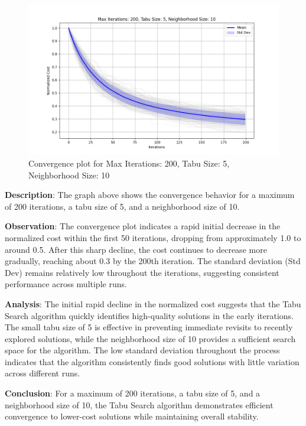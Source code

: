 \documentclass{article}
\begin{document}
    \begin{figure}[H]
        \centering
        \includegraphics[width=\textwidth]{tabu_search/max_iter_200_tabu_size_5_neighborhood_size_10}
        \caption{Convergence plot for Max Iterations: 200, Tabu Size: 5, Neighborhood Size: 10}
        \label{fig:ts_200_5_10}
    \end{figure}

    \textbf{Description}: The graph above shows the convergence behavior for a maximum of 200 iterations, a tabu size of 5, and a neighborhood size of 10.

    \textbf{Observation}: The convergence plot indicates a rapid initial decrease in the normalized cost within the first 50 iterations, dropping from approximately 1.0 to around 0.5. After this sharp decline, the cost continues to decrease more gradually, reaching about 0.3 by the 200th iteration. The standard deviation (Std Dev) remains relatively low throughout the iterations, suggesting consistent performance across multiple runs.

    \textbf{Analysis}: The initial rapid decline in the normalized cost suggests that the Tabu Search algorithm quickly identifies high-quality solutions in the early iterations. The small tabu size of 5 is effective in preventing immediate revisits to recently explored solutions, while the neighborhood size of 10 provides a sufficient search space for the algorithm. The low standard deviation throughout the process indicates that the algorithm consistently finds good solutions with little variation across different runs.

    \textbf{Conclusion}: For a maximum of 200 iterations, a tabu size of 5, and a neighborhood size of 10, the Tabu Search algorithm demonstrates efficient convergence to lower-cost solutions while maintaining overall stability.
\end{document}
